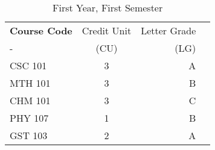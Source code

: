 \documentclass{article}
\begin{document}
	
	\begin{table}[h!]
		\begin{center}
			\caption{First Year, First Semester}
			\label{tab:table1}
			\begin{tabular}{l|c|r|c}
			\textbf{Course Code} & {Credit Unit} & {Letter Grade}\\
			- & (CU) & (LG)\\
			\hline
			CSC 101 & 3 & A\\
			MTH 101 & 3 & B\\
			CHM 101 & 3 & C\\
			PHY 107 & 1 & B\\
			GST 103 & 2 & A\\
			\end{tabular}
		\end{center}
	\end{table}
\end{document}
